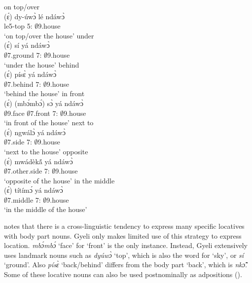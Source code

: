 \ea\label{top} on top/over \\
  \gll (ɛ́) dy-úwɔ̀ lé ndáwɔ̀     \\
           {\LOC}     le5-top 5:{\ATT} $\emptyset$9.house \\
    \trans `on top/over the house'
\ex\label{under} under \\
  \gll (ɛ́) sí yá ndáwɔ̀     \\
           {\LOC}     $\emptyset$7.ground 7:{\ATT} $\emptyset$9.house \\
    \trans `under the house'
\ex\label{behind} behind \\
  \gll (ɛ́) písɛ̀ yá ndáwɔ̀     \\
           {\LOC}     $\emptyset$7.behind 7:{\ATT} $\emptyset$9.house \\
    \trans `behind the house'
\ex\label{front} in front\\
  \gll (ɛ́) (mbɔ́mbɔ́) sɔ̀ yá ndáwɔ̀     \\
           {\LOC} $\emptyset$9.face    $\emptyset$7.front 7:{\ATT} $\emptyset$9.house \\
    \trans `in front of the house'
\ex\label{next} next to \\
  \gll (ɛ́) ngwálɔ̀ yá ndáwɔ̀     \\
           {\LOC}  $\emptyset$7.side 7:{\ATT} $\emptyset$9.house \\
    \trans `next to the house'
\ex\label{opposite} opposite \\
  \gll (ɛ́) mwádèkã́  yá ndáwɔ̀     \\
           {\LOC} $\emptyset$7.other.side 7:{\ATT} $\emptyset$9.house \\
    \trans `opposite of the house'
\ex\label{middle} in the middle\\
  \gll (ɛ́) títímɔ́  yá ndáwɔ̀     \\
           {\LOC}  $\emptyset$7.middle 7:{\ATT} $\emptyset$9.house \\
    \trans `in the middle of the house'
\z

\citet{wilkins96} notes that there is a cross-linguistic tendency to express many specific locatives with body part nouns. Gyeli only makes limited use of this strategy to express location. {\itshape mbɔ́mbɔ́} `face' for `front' is the only instance. Instead, Gyeli extensively uses landmark nouns such as {\itshape dyúwɔ̀} `top', which is also the word for `sky', or {\itshape sí} `ground'. Also {\itshape písɛ̀} `back/behind' differs from the body part `back', which is {\itshape nkɔ̃̂}. Some of these locative nouns can also be used postnominally as adpositions ().



